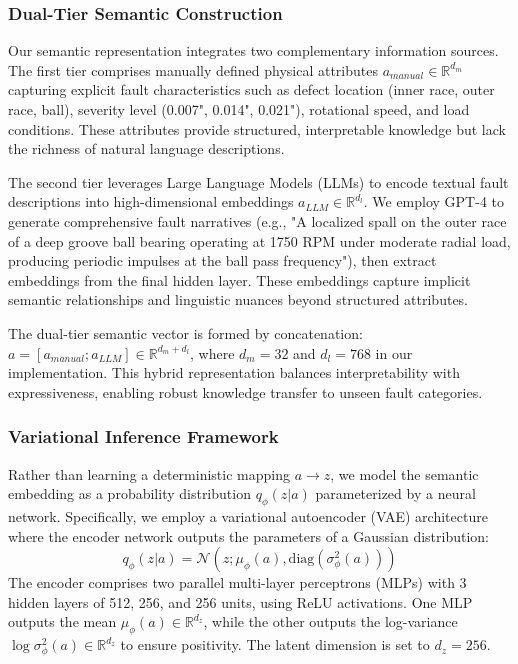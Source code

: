 \documentclass[journal]{IEEEtran}
\begin{document}
\subsubsection{Dual-Tier Semantic Construction}
Our semantic representation integrates two complementary information sources. The first tier comprises manually defined physical attributes $a_{manual} \in \mathbb{R}^{d_m}$ capturing explicit fault characteristics such as defect location (inner race, outer race, ball), severity level (0.007", 0.014", 0.021"), rotational speed, and load conditions. These attributes provide structured, interpretable knowledge but lack the richness of natural language descriptions.

The second tier leverages Large Language Models (LLMs) to encode textual fault descriptions into high-dimensional embeddings $a_{LLM} \in \mathbb{R}^{d_l}$. We employ GPT-4 to generate comprehensive fault narratives (e.g., "A localized spall on the outer race of a deep groove ball bearing operating at 1750 RPM under moderate radial load, producing periodic impulses at the ball pass frequency"), then extract embeddings from the final hidden layer. These embeddings capture implicit semantic relationships and linguistic nuances beyond structured attributes.

The dual-tier semantic vector is formed by concatenation: $a = [a_{manual}; a_{LLM}] \in \mathbb{R}^{d_m + d_l}$, where $d_m=32$ and $d_l=768$ in our implementation. This hybrid representation balances interpretability with expressiveness, enabling robust knowledge transfer to unseen fault categories.

\subsubsection{Variational Inference Framework}
Rather than learning a deterministic mapping $a \rightarrow z$, we model the semantic embedding as a probability distribution $q_\phi(z|a)$ parameterized by a neural network. Specifically, we employ a variational autoencoder (VAE) architecture where the encoder network outputs the parameters of a Gaussian distribution:
\begin{equation}
    q_\phi(z|a) = \mathcal{N}(z; \mu_\phi(a), \text{diag}(\sigma_\phi^2(a)))
    \label{eq:variational_posterior}
\end{equation}
The encoder comprises two parallel multi-layer perceptrons (MLPs) with 3 hidden layers of 512, 256, and 256 units, using ReLU activations. One MLP outputs the mean $\mu_\phi(a) \in \mathbb{R}^{d_z}$, while the other outputs the log-variance $\log \sigma_\phi^2(a) \in \mathbb{R}^{d_z}$ to ensure positivity. The latent dimension is set to $d_z=256$.
\end{document}
